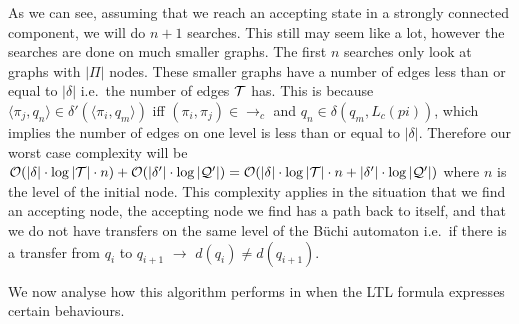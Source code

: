 As we can see, assuming that we reach an accepting state in a strongly connected component, we will do $n+1$ searches. This still may seem like a lot, however the searches are done on much smaller graphs. The first $n$ searches only look at graphs with $|\Pi|$ nodes. These smaller graphs have a number of edges less than or equal to $|\delta|$ i.e.\ the number of edges $\mathcal{T}$ has. This is because $\langle \pi_j, q_n \rangle \in \delta' (\langle \pi_i, q_m \rangle )$ iff $(\pi_i , \pi_j ) \in \rightarrow_c$ and $q_n \in \delta (q_m, L_c(pi))$, which implies the number of edges on one level is less than or equal to $|\delta|$. Therefore our worst case complexity will be $\mathcal{O}(|\delta|\cdot \log |\mathcal{T}| \cdot n) + \mathcal{O}(|\delta'| \cdot \log|\mathcal{Q}'|) = \mathcal{O}(|\delta|\cdot \log |\mathcal{T}| \cdot n + |\delta'| \cdot \log|\mathcal{Q}'|)$ where $n$ is the level of the initial node. This complexity applies in the situation that we find an accepting node, the accepting node we find has a path back to itself, and that we do not have transfers on the same level of the B\"uchi automaton i.e.\ if there is a transfer from $q_i$ to $q_{i+1}$ $\rightarrow$ $d(q_i) \neq d(q_{i+1})$. %


We now analyse how this algorithm performs in when the LTL formula expresses certain behaviours. 